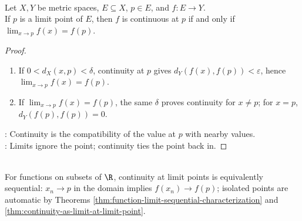 \begin{theorem} \label{thm:continuity-as-limit-at-limit-point} \\
Let $X,Y$ be metric spaces, $E\subseteq X$, $p\in E$, and $f:E\to Y$.\\
If $p$ is a limit point of $E$, then $f$ is continuous at $p$ if and only if $\lim_{x\to p}f(x)=f(p)$.
\begin{proof}
\begin{enumerate}[label=\roman*.]
\setlength{\itemsep}{0pt}
\item[$(\Rightarrow)$] If $0<d_X(x,p)<\delta$, continuity at $p$ gives $d_Y(f(x),f(p))<\varepsilon$, hence $\lim_{x\to p}f(x)=f(p)$.
\item[$(\Leftarrow)$] If $\lim_{x\to p}f(x)=f(p)$, the same $\delta$ proves continuity for $x\neq p$; for $x=p$, $d_Y(f(p),f(p))=0$.
\end{enumerate}
: Continuity is the compatibility of the value at $p$ with nearby values.\\
: Limits ignore the point; continuity ties the point back in.
\end{proof}
\end{theorem}

\begin{remark} \label{rem:sequential-continuity-real-line} \\
For functions on subsets of $\R$, continuity at limit points is equivalently sequential: $x_n\to p$ in the domain implies $f(x_n)\to f(p)$; isolated points are automatic by Theorems \ref{thm:function-limit-sequential-characterization} and \ref{thm:continuity-as-limit-at-limit-point}.
\end{remark}

